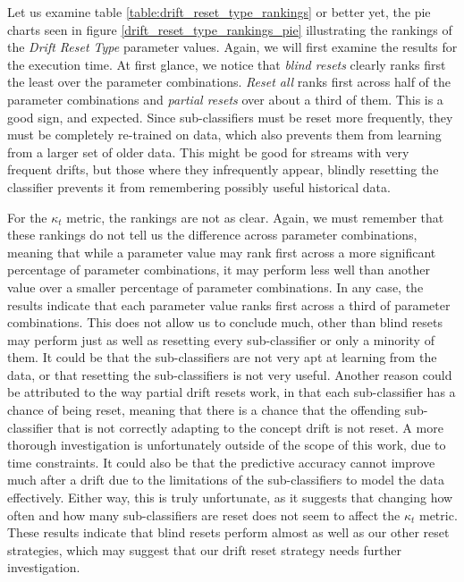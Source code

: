 Let us examine table \ref{table:drift_reset_type_rankings} or better yet, the pie charts seen in figure \ref{drift_reset_type_rankings_pie} illustrating the rankings of the \textit{Drift Reset Type} parameter values.
Again, we will first examine the results for the execution time. At first glance, we notice that \textit{blind resets} clearly ranks first the least over the parameter combinations. \textit{Reset all} ranks first across half of the parameter combinations and \textit{partial resets} over about a third of them. This is a good sign, and expected. Since sub-classifiers must be reset more frequently, they must be completely re-trained on data, which also prevents them from learning from a larger set of older data. This might be good for streams with very frequent drifts, but those where they infrequently appear, blindly resetting the classifier prevents it from remembering possibly useful historical data.

For the $\kappa_t$ metric, the rankings are not as clear. Again, we must remember that these rankings do not tell us the difference across parameter combinations, meaning that while a parameter value may rank first across a more significant percentage of parameter combinations, it may perform less well than another value over a smaller percentage of parameter combinations.
In any case, the results indicate that each parameter value ranks first across a third of parameter combinations. This does not allow us to conclude much, other than blind resets may perform just as well as resetting every sub-classifier or only a minority of them. It could be that the sub-classifiers are not very apt at learning from the data, or that resetting the sub-classifiers is not very useful. Another reason could be attributed to the way partial drift resets work, in that each sub-classifier has a chance of being reset, meaning that there is a chance that the offending sub-classifier that is not correctly adapting to the concept drift is not reset. A more thorough investigation is unfortunately outside of the scope of this work, due to time constraints. It could also be that the predictive accuracy cannot improve much after a drift due to the limitations of the sub-classifiers to model the data effectively. Either way, this is truly unfortunate, as it suggests that changing how often and how many sub-classifiers are reset does not seem to affect the $\kappa_t$ metric.
These results indicate that blind resets perform almost as well as our other reset strategies, which may suggest that our drift reset strategy needs further investigation.


